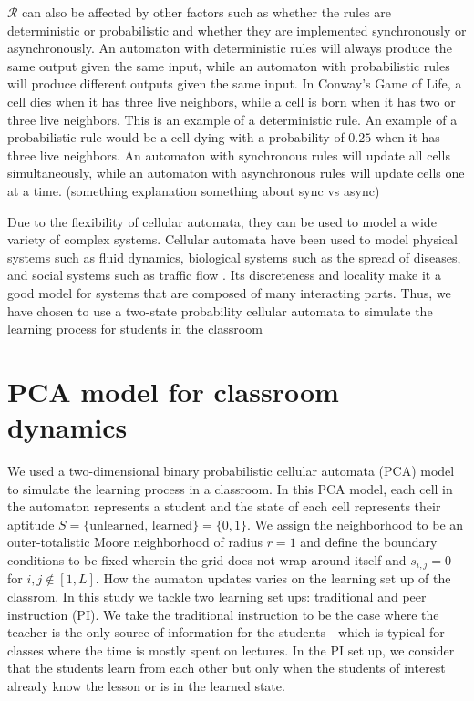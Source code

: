$\mathcal{R}$ can also be affected by other factors such as whether the rules are deterministic or probabilistic and whether they are implemented synchronously or asynchronously. 
An automaton with deterministic rules will always produce the same output given the same input, while an automaton with probabilistic rules will produce different outputs given the same input. 
In Conway's Game of Life, a cell dies when it has three live neighbors, while a cell is born when it has two or three live neighbors. 
This is an example of a deterministic rule. An example of a probabilistic rule would be a cell dying with a probability of $0.25$ when it has three live neighbors. 
An automaton with synchronous rules will update all cells simultaneously, while an automaton with asynchronous rules will update cells one at a time. 
(something explanation something about sync vs async)


Due to the flexibility of cellular automata, they can be used to model a wide variety of complex systems.
 Cellular automata have been used to model physical systems such as fluid dynamics, biological systems such as the spread of diseases, and social systems such as traffic flow \cite{louis2018probabilistic}.
  Its discreteness and locality make it a good model for systems that are composed of many interacting parts.
   Thus, we have chosen to use a two-state probability cellular automata to simulate the learning process for students in the classroom


\section{PCA model for classroom dynamics}
We used a two-dimensional binary probabilistic cellular automata (PCA) model to simulate the learning process in a classroom. 
In this PCA model, each cell in the automaton represents a student and the state of each cell represents their aptitude $S=\lbrace\text{unlearned, learned}\rbrace=\lbrace 0,1 \rbrace$. 
We assign the neighborhood to be an outer-totalistic Moore neighborhood of radius $r=1$ and define the boundary conditions to be fixed wherein the grid does not wrap around itself and $s_{i,j} = 0$ for ${i,j \notin [1,L]}$. 
How the aumaton updates varies on the learning set up of the classrom. In this study we tackle two learning set ups: traditional and peer instruction (PI). 
We take the traditional instruction to be the case where the teacher is the only source of information for the students - which is typical for classes where the time is mostly spent on lectures. 
In the PI set up, we consider that the students learn from each other but only when the students of interest already know the lesson or is in the learned state.

